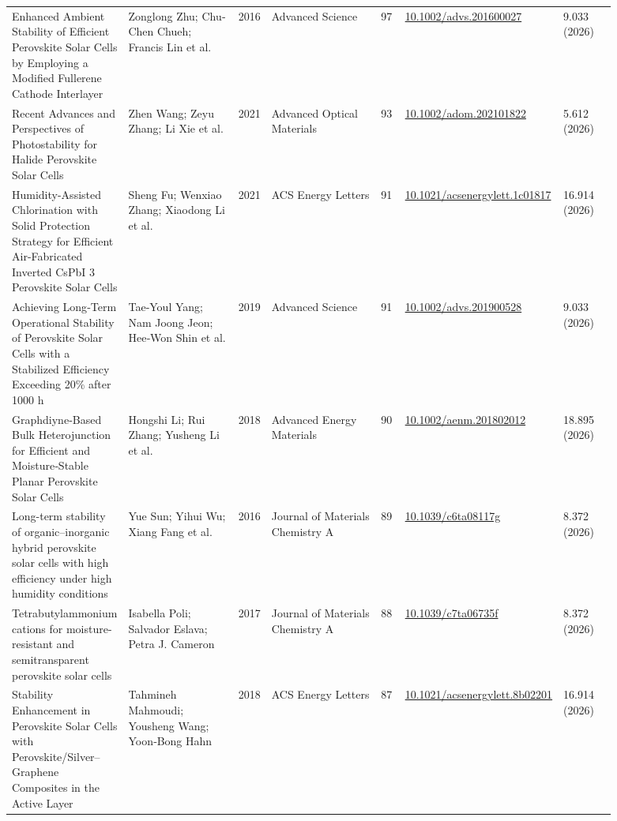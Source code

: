 \documentclass[10pt,a4paper]{article}
\begin{document}
{\begin{longtable}{p{0.197\linewidth}p{0.197\linewidth}p{0.043\linewidth}p{0.197\linewidth}p{0.043\linewidth}p{0.117\linewidth}p{0.098\linewidth}}
Enhanced Ambient Stability of Efficient Perovskite Solar Cells by Employing a Modified Fullerene Cathode Interlayer & Zonglong Zhu; Chu‐Chen Chueh; Francis Lin et al. & 2016 & Advanced Science & 97 & \href{https://doi.org/10.1002/advs.201600027}{10.1002/advs.201600027} & 9.033 (2026) \\
Recent Advances and Perspectives of Photostability for Halide Perovskite Solar Cells & Zhen Wang; Zeyu Zhang; Li Xie et al. & 2021 & Advanced Optical Materials & 93 & \href{https://doi.org/10.1002/adom.202101822}{10.1002/adom.202101822} & 5.612 (2026) \\
Humidity-Assisted Chlorination with Solid Protection Strategy for Efficient Air-Fabricated Inverted CsPbI 3 Perovskite Solar Cells & Sheng Fu; Wenxiao Zhang; Xiaodong Li et al. & 2021 & ACS Energy Letters & 91 & \href{https://doi.org/10.1021/acsenergylett.1c01817}{10.1021/acsenergylett.1c01817} & 16.914 (2026) \\
Achieving Long‐Term Operational Stability of Perovskite Solar Cells with a Stabilized Efficiency Exceeding 20\% after 1000 h & Tae‐Youl Yang; Nam Joong Jeon; Hee‐Won Shin et al. & 2019 & Advanced Science & 91 & \href{https://doi.org/10.1002/advs.201900528}{10.1002/advs.201900528} & 9.033 (2026) \\
Graphdiyne‐Based Bulk Heterojunction for Efficient and Moisture‐Stable Planar Perovskite Solar Cells & Hongshi Li; Rui Zhang; Yusheng Li et al. & 2018 & Advanced Energy Materials & 90 & \href{https://doi.org/10.1002/aenm.201802012}{10.1002/aenm.201802012} & 18.895 (2026) \\
Long-term stability of organic–inorganic hybrid perovskite solar cells with high efficiency under high humidity conditions & Yue Sun; Yihui Wu; Xiang Fang et al. & 2016 & Journal of Materials Chemistry A & 89 & \href{https://doi.org/10.1039/c6ta08117g}{10.1039/c6ta08117g} & 8.372 (2026) \\
Tetrabutylammonium cations for moisture-resistant and semitransparent perovskite solar cells & Isabella Poli; Salvador Eslava; Petra J. Cameron & 2017 & Journal of Materials Chemistry A & 88 & \href{https://doi.org/10.1039/c7ta06735f}{10.1039/c7ta06735f} & 8.372 (2026) \\
Stability Enhancement in Perovskite Solar Cells with Perovskite/Silver–Graphene Composites in the Active Layer & Tahmineh Mahmoudi; Yousheng Wang; Yoon‐Bong Hahn & 2018 & ACS Energy Letters & 87 & \href{https://doi.org/10.1021/acsenergylett.8b02201}{10.1021/acsenergylett.8b02201} & 16.914 (2026) \\

\end{longtable}}
\end{document}
